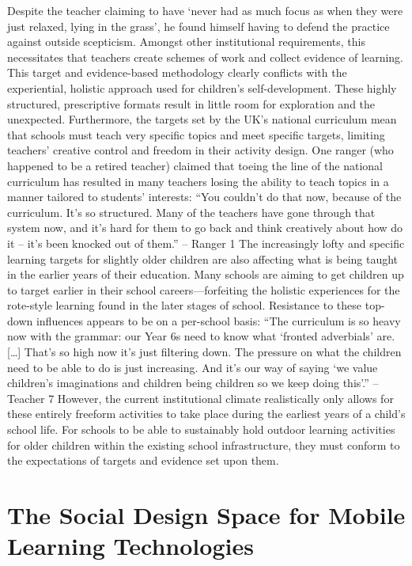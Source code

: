 Despite the teacher claiming to have ‘never had as much focus as when they were just relaxed, lying in the grass’, he found himself having to defend the practice against outside scepticism. Amongst other institutional requirements, this necessitates that teachers create schemes of work and collect evidence of learning. This target and evidence-based methodology clearly conflicts with the experiential, holistic approach used for children’s self-development. These highly structured, prescriptive formats result in little room for exploration and the unexpected. Furthermore, the targets set by the UK’s national curriculum mean that schools must teach very specific topics and meet specific targets, limiting teachers’ creative control and freedom in their activity design. One ranger (who happened to be a retired teacher) claimed that toeing the line of the national curriculum has resulted in many teachers losing the ability to teach topics in a manner tailored to students’ interests:
“You couldn’t do that now, because of the curriculum. It’s so structured. Many of the teachers have gone through that system now, and it’s hard for them to go back and think creatively about how do it – it’s been knocked out of them.” – Ranger 1
The increasingly lofty and specific learning targets for slightly older children are also affecting what is being taught in the earlier years of their education. Many schools are aiming to get children up to target earlier in their school careers—forfeiting the holistic experiences for the rote-style learning found in the later stages of school. Resistance to these top-down influences appears to be on a per-school basis:
“The curriculum is so heavy now with the grammar: our Year 6s need to know what ‘fronted adverbials’ are. […] That's so high now it’s just filtering down. The pressure on what the children need to be able to do is just increasing. And it’s our way of saying ‘we value children’s imaginations and children being children so we keep doing this’.” – Teacher 7 
However, the current institutional climate realistically only allows for these entirely freeform activities to take place during the earliest years of a child’s school life. For schools to be able to sustainably hold outdoor learning activities for older children within the existing school infrastructure, they must conform to the expectations of targets and evidence set upon them.

\section{The Social Design Space for Mobile Learning Technologies}

